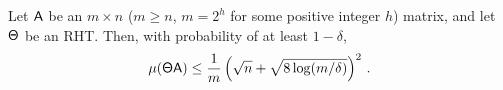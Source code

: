 \begin{lemma} 
\label{lem:rht-reduce}
Let ${\mathsf{A} }$ be an $m\times n$  ($m \ge n$, $m=2^h$ for some positive integer $h$) matrix, and let ${\mathsf{\Theta} }$ be an RHT. Then, with probability of at least $1-\delta$,
\[\mu({\mathsf{\Theta} } {\mathsf{A} }) \leq \frac1{m}\left( \sqrt{n} + \sqrt{8 \log(m / \delta)} \right)^2\,.\]
\end{lemma}
